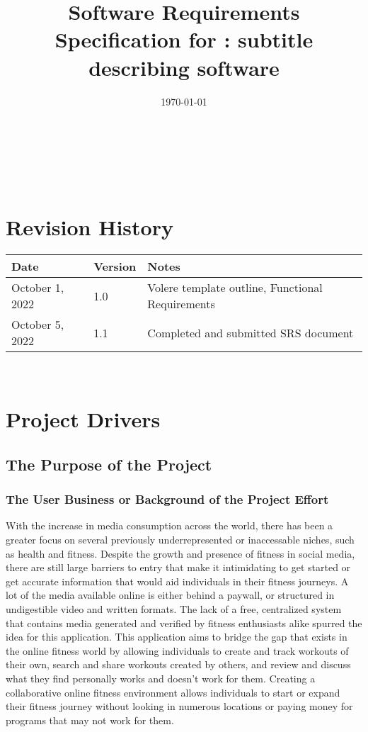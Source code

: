 \documentclass[12pt]{article}
\begin{document}
\title{Software Requirements Specification for \progname: subtitle describing software} 
\author{\authname}
\date{\today}
	
\maketitle

~\newpage


\tableofcontents

~\newpage

\section*{Revision History}

\begin{tabularx}{\textwidth}{p{3cm}p{2cm}X}
\toprule {\bf Date} & {\bf Version} & {\bf Notes}\\
\midrule
October 1, 2022 & 1.0 & Volere template outline, Functional Requirements\\
October 5, 2022 & 1.1 & Completed and submitted SRS document\\
\bottomrule
\end{tabularx}

~\newpage

\section{Project Drivers}
\subsection{The Purpose of the Project}
  \subsubsection{The User Business or Background of the Project Effort}
  \noindent
  With the increase in media consumption across the world, there has been a greater focus on several previously underrepresented or inaccessable niches, such as health and fitness. Despite the growth and presence of fitness in social media, there are still large barriers to entry that make it intimidating to get started or get accurate information that would aid individuals in their fitness journeys. A lot of the media available online is either behind a paywall, or structured in undigestible video and written formats. The lack of a free, centralized system that contains media generated and verified by fitness enthusiasts alike spurred the idea for this application. This application aims to bridge the gap that exists in the online fitness world by allowing individuals to create and track workouts of their own, search and share workouts created by others, and review and discuss what they find personally works and doesn't work for them. Creating a collaborative online fitness environment allows individuals to start or expand their fitness journey without looking in numerous locations or paying money for programs that may not work for them. 
\end{document}
